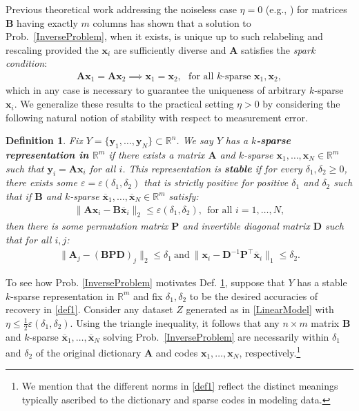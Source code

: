 \documentclass[journal, twocolumn]{IEEEtran}
\newtheorem{definition}{Definition}
\begin{document}
Previous theoretical work addressing the noiseless case $\eta =0$ (e.g., \cite{li2004analysis, Georgiev05, Aharon06, Hillar15}) for matrices $\mathbf{B}$ having exactly $m$ columns has shown that a solution to Prob.~\ref{InverseProblem}, when it exists, is unique up to such relabeling and rescaling provided the $\mathbf{x}_i$ are sufficiently diverse and $\mathbf{A}$ satisfies the \textit{spark condition}:
\begin{align}\label{SparkCondition}
\mathbf{A}\mathbf{x}_1 = \mathbf{A}\mathbf{x}_2 \implies \mathbf{x}_1 = \mathbf{x}_2, \ \ \ \text{for all $k$-sparse } \mathbf{x}_1, \mathbf{x}_2,
\end{align}
%
which in any case is necessary to guarantee the uniqueness of arbitrary $k$-sparse $\mathbf{x}_i$. We generalize these results to the practical setting  $\eta > 0$ by considering the following natural notion of stability with respect to measurement error.


\begin{definition}\label{maindef}
Fix $Y = \{ \mathbf{y}_1, \ldots, \mathbf{y}_N\} \subset \mathbb{R}^n$. We say $Y$ has a \textbf{$k$-sparse representation in $\mathbb{R}^m$} if there exists a matrix $\mathbf{A}$ and $k$-sparse $\mathbf{x}_1, \ldots, \mathbf{x}_N \in \mathbb{R}^m$ such that $\mathbf{y}_i = \mathbf{A}\mathbf{x}_i$ for all $i$. 
This representation is \textbf{stable} if for every $\delta_1, \delta_2 \geq 0$, there exists some $\varepsilon = \varepsilon(\delta_1, \delta_2)$ that is strictly positive for positive $\delta_1$ and $\delta_2$ such that if $\mathbf{B}$ and $k$-sparse $\mathbf{\overline x}_1, \ldots, \mathbf{\overline x}_N \in \mathbb{R}^m$ satisfy:
\begin{align*}
	\|\mathbf{A}\mathbf{x}_i - \mathbf{B}\mathbf{\overline x}_i\|_2 \leq \varepsilon(\delta_1, \delta_2),\ \   \text{for all $i=1,\ldots,N$},
\end{align*}
then there is some permutation matrix $\mathbf{P}$ and invertible diagonal matrix $\mathbf{D}$ such that for all $i, j$:
\begin{align}\label{def1}
\|\mathbf{A}_j - (\mathbf{BPD})_j\|_2 \leq \delta_1 \ \text{and} \ \|\mathbf{x}_i - \mathbf{D}^{-1}\mathbf{P}^{\top}\mathbf{\overline x}_i\|_1 \leq \delta_2.
\end{align}
\end{definition}

To see how Prob. \ref{InverseProblem} motivates Def. \ref{maindef}, suppose that $Y$ has a stable $k$-sparse representation in $\mathbb{R}^m$ and fix $\delta_1, \delta_2$ to be the desired accuracies of recovery in \eqref{def1}. Consider any dataset $Z$ generated as in \eqref{LinearModel} with $\eta \leq \frac{1}{2} \varepsilon(\delta_1, \delta_2)$. Using the triangle inequality, it follows that any $n \times m$ matrix $\mathbf{B}$ and $k$-sparse $\mathbf{\overline x}_1, \ldots, \mathbf{\overline x}_N$ solving Prob.~\ref{InverseProblem} are necessarily within $\delta_1$ and $\delta_2$ of the original dictionary $\mathbf{A}$ and codes $\mathbf{x}_1, \ldots, \mathbf{x}_N$, respectively.\footnote{We mention that the different norms in \eqref{def1} reflect the distinct meanings typically ascribed to the dictionary and sparse codes in modeling data.}
\end{document}
